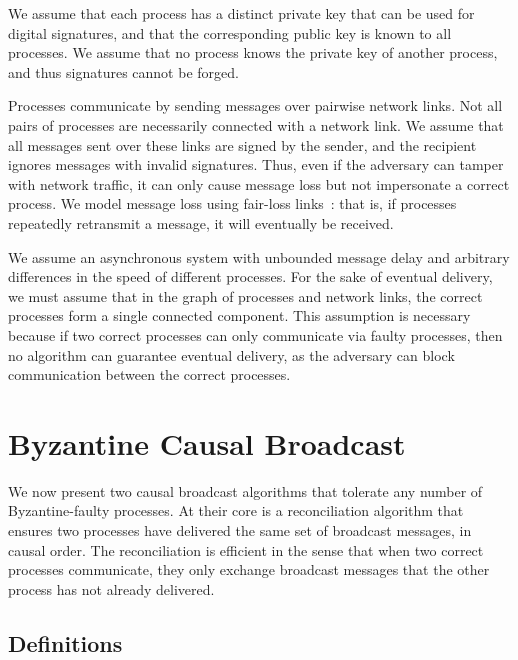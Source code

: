 \documentclass[a4paper,anonymous,USenglish]{lipics-v2019}
\begin{document}
We assume that each process has a distinct private key that can be used for digital signatures, and that the corresponding public key is known to all processes.
We assume that no process knows the private key of another process, and thus signatures cannot be forged.

Processes communicate by sending messages over pairwise network links.
Not all pairs of processes are necessarily connected with a network link.
We assume that all messages sent over these links are signed by the sender, and the recipient ignores messages with invalid signatures.
Thus, even if the adversary can tamper with network traffic, it can only cause message loss but not impersonate a correct process.
We model message loss using fair-loss links~\cite{Cachin:2011wt}: that is, if processes repeatedly retransmit a message, it will eventually be received.

We assume an asynchronous system with unbounded message delay and arbitrary differences in the speed of different processes.
For the sake of eventual delivery, we must assume that in the graph of processes and network links, the correct processes form a single connected component.
This assumption is necessary because if two correct processes can only communicate via faulty processes, then no algorithm can guarantee eventual delivery, as the adversary can block communication between the correct processes.




\section{Byzantine Causal Broadcast}\label{sec:algorithm}

We now present two causal broadcast algorithms that tolerate any number of Byzantine-faulty processes.
At their core is a reconciliation algorithm that ensures two processes have delivered the same set of broadcast messages, in causal order.
The reconciliation is efficient in the sense that when two correct processes communicate, they only exchange broadcast messages that the other process has not already delivered.

\subsection{Definitions}
\end{document}

